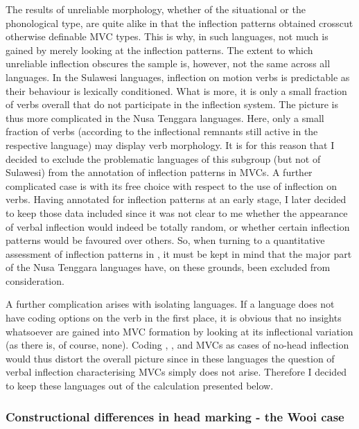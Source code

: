 The results of unreliable morphology, whether of the situational or the phonological type, are quite alike in that the inflection patterns obtained crosscut otherwise definable MVC types. This is why, in such languages, not much is gained by merely looking at the inflection patterns. The extent to which unreliable inflection obscures the sample is, however, not the same across all languages. In the Sulawesi languages, inflection on motion verbs is predictable as their behaviour is lexically conditioned. What is more, it is only a small fraction of verbs overall that do not participate in the inflection system. The picture is thus more complicated in the Nusa Tenggara languages. Here, only a small fraction of verbs (according to the inflectional remnants still active in the respective language) may display verb morphology. It is for this reason that I decided to exclude the problematic languages of this subgroup (but not of Sulawesi) from the annotation of inflection patterns in MVCs. A further complicated case is  with its free choice with respect to the use of inflection on verbs. Having annotated  for inflection patterns at an early stage, I later decided to keep those data included since it was not clear to me whether the appearance of verbal inflection would indeed be totally random, or whether certain inflection patterns would be favoured over others. So, when turning to a quantitative assessment of inflection patterns in , it must be kept in mind that the major part of the Nusa Tenggara languages have, on these grounds, been excluded from consideration.

A further complication arises with isolating languages. If a language does not have coding options on the verb in the first place, it is obvious that no insights whatsoever are gained into MVC formation by looking at its inflectional variation (as there is, of course, none). Coding , ,  and  MVCs as cases of no-head inflection would thus distort the overall picture since in these languages the question of verbal inflection characterising MVCs simply does not arise. Therefore I decided to keep these languages out of the calculation presented below.

\subsubsection{Constructional differences in head marking - the Wooi case}\label{sec:wooicase}

